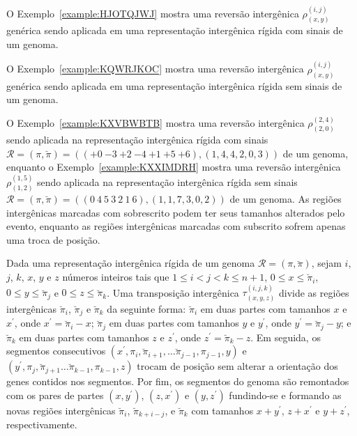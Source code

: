 O Exemplo~\ref{example:HJOTQJWJ} mostra uma reversão intergênica $\rho^{(i, j)}_{(x, y)}$ genérica sendo aplicada em uma representação intergênica rígida com sinais de um genoma.



O Exemplo~\ref{example:KQWRJKOC} mostra uma reversão intergênica $\rho^{(i, j)}_{(x, y)}$ genérica sendo aplicada em uma representação intergênica rígida sem sinais de um genoma.

\pagebreak



O Exemplo~\ref{example:KXVBWBTB} mostra uma reversão intergênica $\rho^{(2,4)}_{(2,0)}$ sendo aplicada na representação intergênica rígida com sinais $\mathcal{R} = (\pi,\breve\pi) = \allowbreak(({+0}~{-3}~{+2}~{-4}~{+1}~{+5}~{+6}),\allowbreak(1,4,4,2,0,3))$ de um genoma, enquanto o Exemplo~\ref{example:KXXIMDRH} mostra uma reversão intergênica $\rho^{(1,5)}_{(1,2)}$ sendo aplicada na representação intergênica rígida sem sinais $\mathcal{R} = (\pi,\breve\pi) = \allowbreak(({0}~{4}~{5}~{3}~{2}~{1}~{6}),\allowbreak(1,1,7,3,0,2))$ de um genoma. As regiões intergênicas marcadas com sobrescrito podem ter seus tamanhos alterados pelo evento, enquanto as regiões intergênicas marcadas com subscrito sofrem apenas uma troca de posição.





\begin{definition}
Dada uma representação intergênica rígida de um genoma $\mathcal{R} = (\pi,\breve\pi)$, sejam $i$, $j$, $k$, $x$, $y$ e $z$ números inteiros tais que $1 \le i < j < k \le n+1$, $0 \le x \le \breve\pi_i$, $0 \le y \le \breve\pi_j$ e $0 \le z \le \breve\pi_k$. Uma transposição intergênica $\tau^{(i,j,k)}_{(x,y,z)}$ divide as regiões intergênicas $\breve\pi_i$, $\breve\pi_{j}$ e $\breve\pi_k$ da seguinte forma: $\breve\pi_i$ em duas partes com tamanhos $x$ e $x^{\prime}$, onde $x^{\prime}=\breve\pi_i-x$; $\breve\pi_{j}$ em duas partes com tamanhos $y$ e $y^{\prime}$, onde $y^{\prime}=\breve\pi_{j}-y$; e $\breve\pi_{k}$ em duas partes com tamanhos $z$ e $z^{\prime}$, onde $z^{\prime}=\breve\pi_{k}-z$. Em seguida, os segmentos consecutivos $(x^{\prime},\pi_i,\breve\pi_{i+1},\dots \breve \pi_{j-1},\pi_{j-1},y)$ e $(y^{\prime},\pi_j,\breve\pi_{j+1}\dots \breve\pi_{k-1},\pi_{k-1},z)$ trocam de posição sem alterar a orientação dos genes contidos nos segmentos. Por fim, os segmentos do genoma são remontados com os pares de partes $(x,y^{\prime})$, $(z,x^{\prime})$ e $(y,z^{\prime})$ fundindo-se e formando as novas regiões intergênicas $\breve\pi_{i}$, $\breve\pi_{k+i-j}$, e $\breve\pi_{k}$ com tamanhos $x + y^{\prime}$, $z + x^{\prime}$ e $y + z^{\prime}$, respectivamente.
\end{definition}

